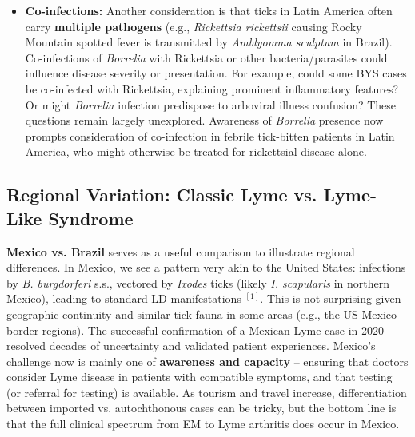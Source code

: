 \documentclass[11pt,letterpaper]{article}
\newcommand{\mycite}[1]{$^{[#1]}$}
\begin{document}
\begin{itemize}
    \item \textbf{Co-infections:} Another consideration is that ticks in Latin America often carry \textbf{multiple pathogens} (e.g., \textit{Rickettsia rickettsii} causing Rocky Mountain spotted fever is transmitted by \textit{Amblyomma sculptum} in Brazil). Co-infections of \textit{Borrelia} with Rickettsia or other bacteria/parasites could influence disease severity or presentation. For example, could some BYS cases be co-infected with Rickettsia, explaining prominent inflammatory features? Or might \textit{Borrelia} infection predispose to arboviral illness confusion? These questions remain largely unexplored. Awareness of \textit{Borrelia} presence now prompts consideration of co-infection in febrile tick-bitten patients in Latin America, who might otherwise be treated for rickettsial disease alone.
\end{itemize}

\subsection{Regional Variation: Classic Lyme vs. Lyme-Like Syndrome}
\textbf{Mexico vs. Brazil} serves as a useful comparison to illustrate regional differences. In Mexico, we see a pattern very akin to the United States: infections by \textit{B. burgdorferi} s.s., vectored by \textit{Ixodes} ticks (likely \textit{I. scapularis} in northern Mexico), leading to standard LD manifestations \mycite{1}. This is not surprising given geographic continuity and similar tick fauna in some areas (e.g., the US-Mexico border regions). The successful confirmation of a Mexican Lyme case in 2020 resolved decades of uncertainty and validated patient experiences. Mexico's challenge now is mainly one of \textbf{awareness and capacity} – ensuring that doctors consider Lyme disease in patients with compatible symptoms, and that testing (or referral for testing) is available. As tourism and travel increase, differentiation between imported vs. autochthonous cases can be tricky, but the bottom line is that the full clinical spectrum from EM to Lyme arthritis does occur in Mexico.
\end{document}
